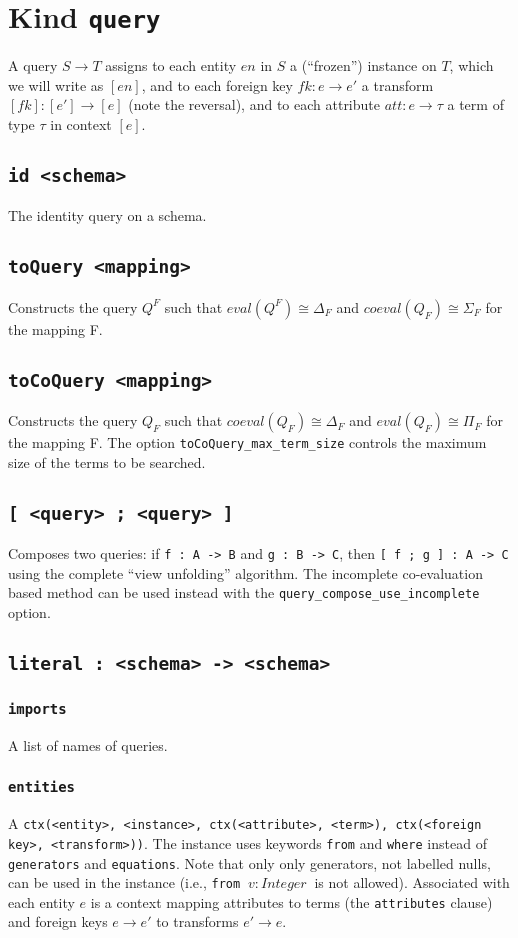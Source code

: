 \documentclass[10pt]{book}
\begin{document}
\chapter{Kind  {\tt query}}
A query $S \to T$ assigns to each entity $en$ in $S$ a (``frozen'') instance on $T$, which we will write as $[en]$, and to each foreign key $fk : e \to e'$ a transform $[fk] : [e'] \to [e]$ (note the reversal), and to each attribute $att : e \to \tau$ a term of type $\tau$ in context $[e]$.  

\section{{\tt id <schema>}}
The identity query on a schema.

\section{{\tt toQuery <mapping>}}
Constructs the query $Q^F$ such that $eval(Q^F) \cong \Delta_F$ and $coeval(Q_F) \cong \Sigma_F$ for the mapping F.

\section{{\tt toCoQuery <mapping>}}
Constructs the query $Q_F$ such that $coeval(Q_F) \cong \Delta_F$ and $eval(Q_F) \cong \Pi_F$ for the mapping F.  The option {\tt toCoQuery\_max\_term\_size} controls the maximum size of the terms to be searched.

\section{{\tt [ <query> ; <query> ]}}
Composes two queries: if {\tt f : A -> B} and {\tt g : B -> C}, then {\tt [ f ; g ] : A -> C} using the complete ``view unfolding'' algorithm.   The incomplete co-evaluation based method can be used instead with the {\tt query\_compose\_use\_incomplete} option.

\section{{\tt literal : <schema> -> <schema>}}
\subsection{{\tt imports}}
A list of names of queries.
\subsection{{\tt entities}}
A {\tt ctx(<entity>, <instance>, ctx(<attribute>, <term>), {\tt ctx(<foreign key>, <transform>)})}.  The instance uses keywords {\tt from} and {\tt where} instead of {\tt generators} and {\tt equations}.  Note that only only generators, not labelled nulls, can be used in the instance (i.e., {\tt from} $\ v:Integer \ $ is not allowed).  Associated with each entity $e$ is a context mapping attributes to terms (the {\tt attributes} clause) and foreign keys $e \to e'$ to transforms $e' \to e$. 
\end{document}
